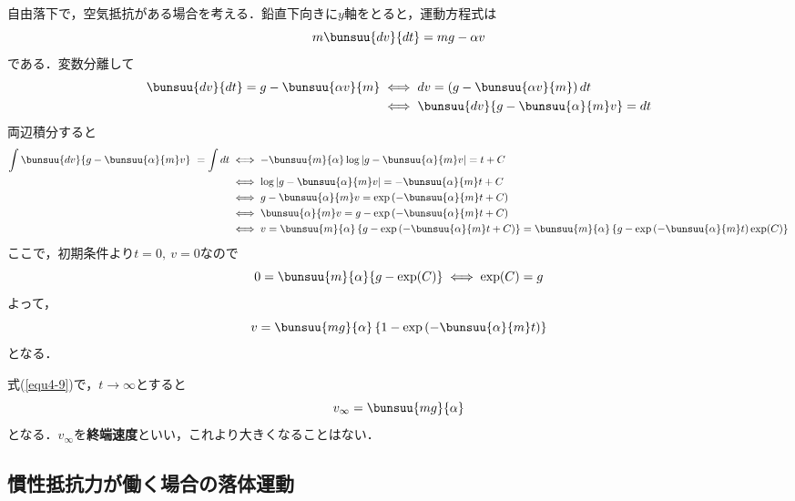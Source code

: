 自由落下で，空気抵抗がある場合を考える．鉛直下向きに$y$軸をとると，運動方程式は
\begin{equation}
	m\bunsuu{dv}{dt} = mg - \alpha v
\end{equation}
である．変数分離して
\begin{align*}
	\bunsuu{dv}{dt} = g - \bunsuu{\alpha v}{m} &
	\iff dv = \left(g - \bunsuu{\alpha v}{m}\right)dt\\
	& \iff \bunsuu{dv}{g - \bunsuu{\alpha}{m}v} = dt
\end{align*}
両辺積分すると
\begin{align*}
	\int \bunsuu{dv}{g - \bunsuu{\alpha}{m}v}\ = \int dt
	&\iff -\bunsuu{m}{\alpha}\log\left|g - \bunsuu{\alpha}{m}v\right| = t + C\\
	&\iff \log\left|g - \bunsuu{\alpha}{m}v\right| = -\bunsuu{\alpha}{m}t + C\\
	&\iff g - \bunsuu{\alpha}{m}v = \exp\left(-\bunsuu{\alpha}{m}t + C\right)\\
	&\iff \bunsuu{\alpha}{m} v = g - \exp\left(-\bunsuu{\alpha}{m}t + C\right)\\
	&\iff v = \bunsuu{m}{\alpha}\left\{g - \exp\left(-\bunsuu{\alpha}{m}t + C\right)\right\} = \bunsuu{m}{\alpha}\left\{g - \exp\left(-\bunsuu{\alpha}{m}t\right)\exp(C)\right\}
\end{align*}
ここで，初期条件より$t = 0,\ v = 0$なので
\begin{equation*}
	0 = \bunsuu{m}{\alpha}\{g - \exp(C)\} \iff \exp(C) = g
\end{equation*}
よって，
\begin{equation}
	v = \bunsuu{mg}{\alpha}\left\{1 - \exp\left(-\bunsuu{\alpha}{m}t\right)\right\} \label{equ4-9}
\end{equation}
となる．

式(\ref{equ4-9})で，$t \to \infty$とすると
\begin{equation}
	v_{\infty} = \bunsuu{mg}{\alpha}
\end{equation}
となる．$v_{\infty}$を\textbf{終端速度}といい，これより大きくなることはない．



\subsection{慣性抵抗力が働く場合の落体運動}

